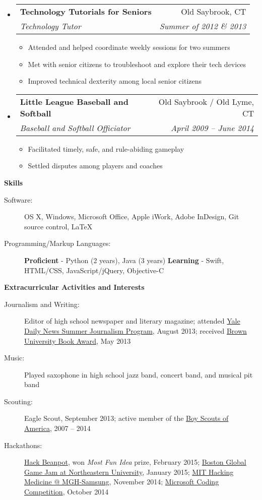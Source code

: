 \documentclass[letterpaper,10pt]{article}
\makeatletter
\newcommand{\resitem}[1]{\item #1 \vspace{-2pt}}
\newcommand{\resheading}[1]{{\large \colorbox{mygrey}{\begin{minipage}{\textwidth}{\textbf{#1 \vphantom{p\^{E}}}}\end{minipage}}}}
\newcommand{\ressubheading}[4]{
\begin{tabular*}{6.8in}{l@{\extracolsep{\fill}}r}
		\textbf{#1} & #2 \\
		\emph{#3} & \emph{#4} \\
\end{tabular*}\vspace{-6pt}}
\makeatother
\begin{document}
\begin{itemize}[leftmargin=*]
		\item[]
			\ressubheading{Technology Tutorials for Seniors}{Old Saybrook, CT}
				{Technology Tutor}{Summer of 2012 \& 2013}
				{\footnotesize 
				\begin{itemize}
					\resitem{Attended and helped coordinate weekly sessions for two summers}
					\resitem{Met with senior citizens to troubleshoot and explore their tech devices}
					\resitem{Improved technical dexterity among local senior citizens}
				\end{itemize}}
		\item[]
			\ressubheading{Little League Baseball and Softball}{Old Saybrook / Old Lyme, CT}
						{Baseball and Softball Officiator}{April 2009 -- June 2014}
				{\footnotesize
				\begin{itemize}
					\resitem{Facilitated timely, safe, and rule-abiding gameplay}
					\resitem{Settled disputes among players and coaches}
				\end{itemize}}
	\end{itemize}  %
	
\resheading{Skills}
	\begin{description}
		\item[Software:] {\footnotesize OS X, Windows, Microsoft Office, Apple iWork, Adobe InDesign, Git source control, \LaTeX}
		\item[Programming/Markup Languages:] {\footnotesize \textbf{Proficient} - Python (2 years), Java (3 years) \enspace \textbf{Learning} - Swift, HTML/CSS, JavaScript/jQuery, Objective-C}
	
	\end{description}

\resheading{Extracurricular Activities and Interests}
	\begin{description}
		\item[Journalism and Writing:] { \footnotesize Editor of high school newspaper and literary magazine; attended \href{http://yaledailynews.com/about-us/sjp/}{Yale Daily News Summer Journalism Program}, August 2013; received \href{http://www.brown.edu/campus-life/support/bookstore/book-award}{Brown University Book Award}, May 2013}
		\item[Music:] { \footnotesize Played saxophone in high school jazz band, concert band, and musical pit band}
		\item[Scouting:] {\footnotesize Eagle Scout, September 2013; active member of the \href{http://www.scouting.org}{Boy Scouts of America}, 2007 -- 2014}
		\item[Hackathons:] {\footnotesize \href{http://hackbeanpot.com}{Hack Beanpot}, won \emph{Most Fun Idea} prize, February 2015; \href{http://globalgamejam.org/2014/jam-sites/boston-ggj-northeastern-university}{Boston Global Game Jam at Northeastern University}, January 2015; \href{http://hackingmedicine.mit.edu/upcoming-events/mgh-samsung/}{MIT Hacking Medicine @ MGH-Samsung}, November 2014; \href{http://www.northeastern.edu/careers/employers/microsoft-coding-competition/}{Microsoft Coding Competition}, October 2014}
		
	\end{description} %
	
\end{document}
